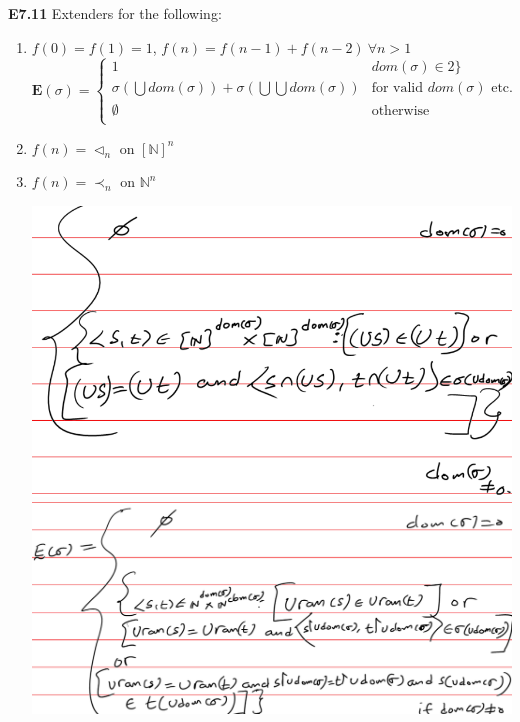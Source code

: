 \documentclass[10pt, landscape]{article}
\begin{document}
\begin{multicols*}{3}
\textbf{E7.11} Extenders for the following:
\begin{enumerate}
    \item $f(0)=f(1)=1$, $f(n)=f(n-1)+f(n-2) \ \forall n > 1$ $\mathbf{E}(\sigma) =
    \left\{
    \begin{array}{lr}
      1 & \text{$dom(\sigma) \in 2\}$} \\
      \sigma(\bigcup dom(\sigma))+\sigma(\bigcup \bigcup dom(\sigma)) & \text{for valid $dom(\sigma)$ etc.} \\
      \emptyset & \text{otherwise} \\
    \end{array}
    \right.
    $
    \item $f(n)=\lhd_n$ on $[\mathbb{N}]^n$
    \item $f(n)=\prec_n$ on $\mathbb{N}^n$
    \begin{center}
        \includegraphics[width=0.49\linewidth]{extender1.png}    
        \includegraphics[width=0.49\linewidth]{extender2.png}    
    \end{center}
\end{enumerate}



\end{multicols*}
\end{document}
